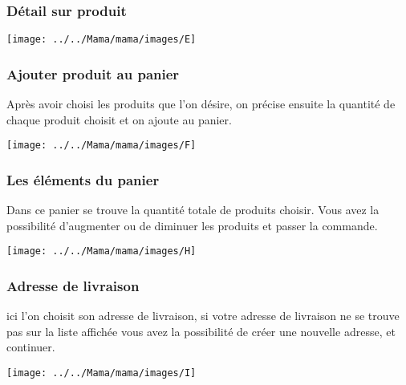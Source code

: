 \subsubsection*{Détail sur produit}
\begin{minipage}[c]{.45\textwidth}
	\begin{center}
	\texttt{[image: ../../Mama/mama/images/E]}
\end{center}
\end{minipage}

\subsubsection*{Ajouter produit au panier}
Après avoir choisi les produits que l'on désire, on précise ensuite la quantité de chaque produit choisit et on ajoute au panier.

\begin{minipage}[c]{0,45\textwidth}
	\begin{center}
	\texttt{[image: ../../Mama/mama/images/F]}
\end{center}
\end{minipage}


\subsubsection*{Les éléments du panier}
Dans ce panier se trouve la quantité totale de produits choisir. Vous avez la possibilité d'augmenter ou de diminuer les produits et passer la commande.

\begin{minipage}[c]{0,45\textwidth}
	\begin{center}
	\texttt{[image: ../../Mama/mama/images/H]}
\end{center}
\end{minipage}


\subsubsection*{Adresse de livraison}
ici l'on choisit son adresse de livraison, si votre adresse de livraison ne se trouve pas sur la liste affichée vous avez la possibilité de créer une nouvelle adresse, et continuer.

\begin{minipage}[c]{0,45\textwidth}
	\begin{center}
	\texttt{[image: ../../Mama/mama/images/I]}
\end{center}
\end{minipage}

